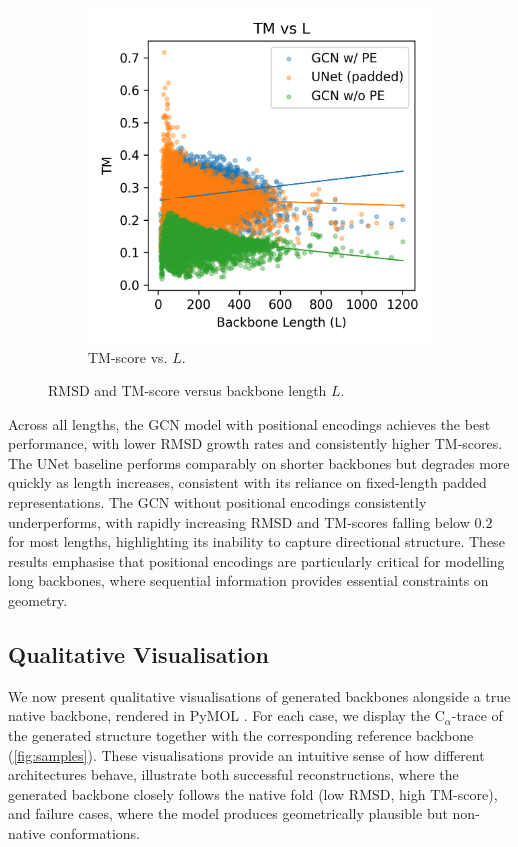 \documentclass[a4paper,12pt]{article}
\begin{document}
\begin{figure}[htbp]
\begin{subfigure}[b]{0.495\textwidth}
        \includegraphics[width=\linewidth]{tm_vs_L.png}
        \caption{TM-score vs. \(L\).}
        \label{fig:tm-vs-l}
    \end{subfigure}
    \caption{RMSD and TM-score versus backbone length \(L\).}
    \label{fig:rmsd-tm-vs-l}
\end{figure}

Across all lengths, the GCN model with positional encodings achieves the best performance, with lower RMSD growth rates and consistently higher TM-scores. The UNet baseline performs comparably on shorter backbones but degrades more quickly as length increases, consistent with its reliance on fixed-length padded representations. The GCN without positional encodings consistently underperforms, with rapidly increasing RMSD and TM-scores falling below \(0.2\) for most lengths, highlighting its inability to capture directional structure. These results emphasise that positional encodings are particularly critical for modelling long backbones, where sequential information provides essential constraints on geometry.

\subsection{Qualitative Visualisation}\label{subsec:visualisation}
We now present qualitative visualisations of generated backbones alongside a true native backbone, rendered in PyMOL \citep{PyMOL,JyMOL,AxPyMOL}. For each case, we display the C\(_\alpha\)-trace of the generated structure together with the corresponding reference backbone (\cref{fig:samples}). These visualisations provide an intuitive sense of how different architectures behave, illustrate both successful reconstructions, where the generated backbone closely follows the native fold (low RMSD, high TM-score), and failure cases, where the model produces geometrically plausible but non-native conformations.
\end{document}
